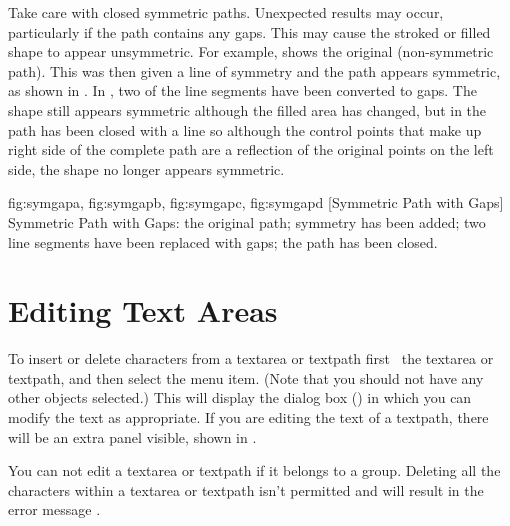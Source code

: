 \begin{warning}
Take care with closed symmetric paths. Unexpected results
may occur, particularly if the path contains any gaps. This may
cause the stroked or filled shape to appear unsymmetric.
For example,  shows the original
(non-symmetric path). This was then given a line of symmetry and
the path appears symmetric, as shown in . In
, two of the line segments have been
converted to gaps. The shape still appears symmetric although the
filled area has changed, but in  the path
has been closed with a line so although the control points that
make up right side of the complete path are a reflection of the
original points on the left side, the shape no longer appears
symmetric.
\end{warning}

{
  {fig:symgapa}{}{},
  {fig:symgapb}{}{},
  {fig:symgapc}{}{},
  {fig:symgapd}{}{}
}
[Symmetric Path with Gaps]
{Symmetric Path with Gaps:
 the original path;
 symmetry has been added;
 two line segments have been replaced with gaps;
 the path has been closed.}


\section{Editing Text Areas}\label{sec:edittext}


To insert or delete characters from a \gls{textarea} or \gls{textpath} first
\select\ the \gls*{textarea} or \gls*{textpath}, and then
select the  menu item.  (Note
that you should not have any other \glspl{object} selected.) This
will display the  dialog box
() in which you can modify the text as
appropriate. If you are editing the text of a \gls{textpath}, there
will be an extra panel visible, shown in
.

\begin{information}
You can not edit a \gls*{textarea} or \gls*{textpath} if
it belongs to a \gls{group}. Deleting all the characters within a
\gls*{textarea} or \gls*{textpath} isn't permitted and will result
in the error message .
\end{information}

